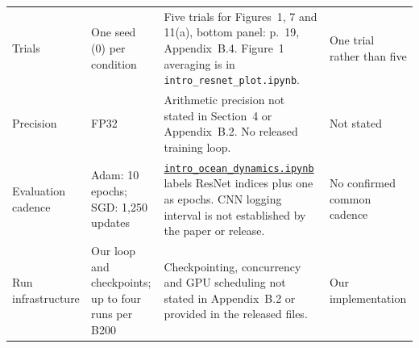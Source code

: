\begin{longtable}{@{}>{\raggedright\arraybackslash}p{}>{\raggedright\arraybackslash}p{}>{\raggedright\arraybackslash}p{}>{\raggedright\arraybackslash}p{}@{}}
Trials & One seed (0) per condition & Five trials for Figures~1, 7 and 11(a), bottom panel: p.~19, Appendix~B.4. Figure~1 averaging is in \texttt{intro\_resnet\_plot.ipynb}. & One trial rather than five\\
Precision & FP32 & Arithmetic precision not stated in Section~4 or Appendix~B.2. No released training loop. & Not stated\\
Evaluation cadence & Adam: 10 epochs; SGD: 1,250 updates & \href{https://gitlab.com/harvard-machine-learning/double-descent/-/blob/0d653296f870e6bf7ee82dc71b4f7b49d53fa85d/intro_ocean_dynamics.ipynb}{\texttt{intro\_ocean\_dynamics.ipynb}} labels ResNet indices plus one as epochs. CNN logging interval is not established by the paper or release. & No confirmed common cadence\\
Run infrastructure & Our loop and checkpoints; up to four runs per B200 & Checkpointing, concurrency and GPU scheduling not stated in Appendix~B.2 or provided in the released files. & Our implementation\\
\end{longtable}
